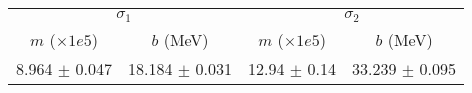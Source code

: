 \begin{tabular}{cc|cc}
\multicolumn{2}{c|}{$\sigma_1$} & \multicolumn{2}{|c}{$\sigma_2$} \\
$m$ ($\times1e5$) & $b$ (MeV) & $m$ ($\times1e5$) & $b$ (MeV) \\
\hline
8.964 $\pm$ 0.047 & 18.184 $\pm$ 0.031 & 12.94 $\pm$ 0.14 & 33.239 $\pm$ 0.095\\
\end{tabular}
